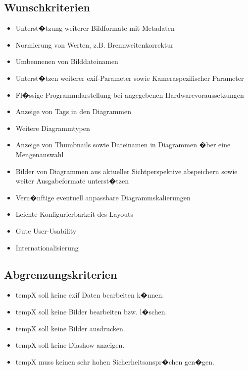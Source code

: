 \subsection{Wunschkriterien} 
\begin{itemize}
  \item Unterst�tzung weiterer Bildformate mit Metadaten
	\item Normierung von Werten, z.B. Brennweitenkorrektur
	\item Umbennenen von Bilddateinamen
	\item Unterst�tzen weiterer \gls{exif}-Parameter sowie Kameraspezifischer Parameter
	\item Fl�ssige Programmdarstellung bei angegebenen Hardwarevoraussetzungen
	\item Anzeige von Tags in den Diagrammen
	\item Weitere Diagrammtypen
	\item Anzeige von Thumbnails sowie Dateinamen in Diagrammen �ber eine Mengenauswahl
	\item Bilder von Diagrammen aus aktueller Sichtperspektive abspeichern sowie weiter Ausgabeformate unterst�tzen 
	\item Vern�nftige eventuell anpassbare Diagrammskalierungen
	\item Leichte Konfigurierbarkeit des Layouts
	\item Gute User-Usability
	\item Internationalisierung
\end{itemize}

\subsection{Abgrenzungskriterien} 
\begin{itemize}
	\item \gls{tempX} soll keine \gls{exif} Daten bearbeiten k�nnen.
	\item \gls{tempX} soll keine Bilder bearbeiten bzw. l�schen.
	\item \gls{tempX} soll keine Bilder ausdrucken.
	\item \gls{tempX} soll keine Diashow anzeigen.
	\item \gls{tempX} muss keinen sehr hohen Sicherheitsanspr�chen gen�gen.
\end{itemize}
